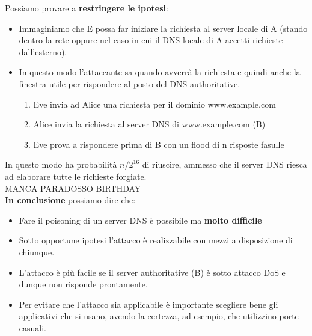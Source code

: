\documentclass[12pt]{article}
\begin{document}
				Possiamo provare a \textbf{restringere le ipotesi}: 
				\begin{itemize}
					\item Immaginiamo che E possa far iniziare la richiesta al server locale di A (stando dentro la rete oppure nel caso in cui il DNS locale di A accetti richieste dall'esterno).
					\item In questo modo l'attaccante sa quando avverrà la richiesta e quindi anche la finestra utile per rispondere al posto del DNS authoritative.
					\begin{enumerate}
						\item Eve invia ad Alice una richiesta per il dominio www.example.com
						\item Alice invia la richiesta al server DNS di www.example.com (B)
						\item Eve prova a rispondere prima di B con un flood di n risposte fasulle
					\end{enumerate}
				\end{itemize}
				In questo modo ha probabilità $n/2^{16}$ di riuscire, ammesso che il server DNS riesca ad elaborare tutte le richieste forgiate.\\
				
				MANCA PARADOSSO BIRTHDAY\\
				
				\textbf{In conclusione} possiamo dire che:
				\begin{itemize}
					\item Fare il poisoning di un server DNS è possibile ma \textbf{molto difficile}
					\item Sotto opportune ipotesi l'attacco è realizzabile con mezzi a disposizione di chiunque.
					\item L'attacco è più facile se il server authoritative (B) è sotto attacco DoS e dunque non risponde prontamente.
					\item Per evitare che l'attacco sia applicabile è importante scegliere bene gli applicativi che si usano, avendo la certezza, ad esempio, che utilizzino porte casuali.
				\end{itemize}
\end{document}
